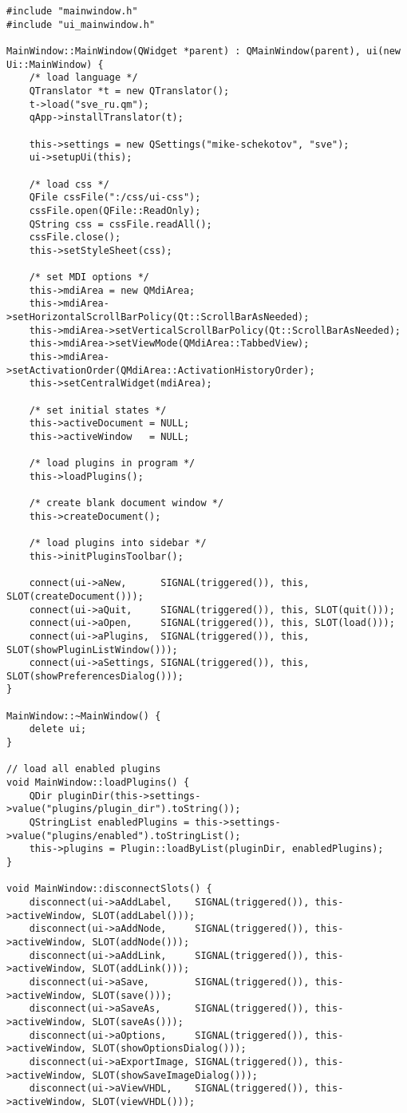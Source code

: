 \begin{lstlisting}
#include "mainwindow.h"
#include "ui_mainwindow.h"

MainWindow::MainWindow(QWidget *parent) : QMainWindow(parent), ui(new Ui::MainWindow) {
    /* load language */
    QTranslator *t = new QTranslator();
    t->load("sve_ru.qm");
    qApp->installTranslator(t);

    this->settings = new QSettings("mike-schekotov", "sve");
    ui->setupUi(this);

    /* load css */
    QFile cssFile(":/css/ui-css");
    cssFile.open(QFile::ReadOnly);
    QString css = cssFile.readAll();
    cssFile.close();
    this->setStyleSheet(css);

    /* set MDI options */
    this->mdiArea = new QMdiArea;
    this->mdiArea->setHorizontalScrollBarPolicy(Qt::ScrollBarAsNeeded);
    this->mdiArea->setVerticalScrollBarPolicy(Qt::ScrollBarAsNeeded);
    this->mdiArea->setViewMode(QMdiArea::TabbedView);
    this->mdiArea->setActivationOrder(QMdiArea::ActivationHistoryOrder);
    this->setCentralWidget(mdiArea);

    /* set initial states */
    this->activeDocument = NULL;
    this->activeWindow   = NULL;

    /* load plugins in program */
    this->loadPlugins();

    /* create blank document window */
    this->createDocument();

    /* load plugins into sidebar */
    this->initPluginsToolbar();

    connect(ui->aNew,      SIGNAL(triggered()), this, SLOT(createDocument()));
    connect(ui->aQuit,     SIGNAL(triggered()), this, SLOT(quit()));
    connect(ui->aOpen,     SIGNAL(triggered()), this, SLOT(load()));
    connect(ui->aPlugins,  SIGNAL(triggered()), this, SLOT(showPluginListWindow()));
    connect(ui->aSettings, SIGNAL(triggered()), this, SLOT(showPreferencesDialog()));
}

MainWindow::~MainWindow() {
    delete ui;
}

// load all enabled plugins
void MainWindow::loadPlugins() {
    QDir pluginDir(this->settings->value("plugins/plugin_dir").toString());
    QStringList enabledPlugins = this->settings->value("plugins/enabled").toStringList();
    this->plugins = Plugin::loadByList(pluginDir, enabledPlugins);
}

void MainWindow::disconnectSlots() {
    disconnect(ui->aAddLabel,    SIGNAL(triggered()), this->activeWindow, SLOT(addLabel()));
    disconnect(ui->aAddNode,     SIGNAL(triggered()), this->activeWindow, SLOT(addNode()));
    disconnect(ui->aAddLink,     SIGNAL(triggered()), this->activeWindow, SLOT(addLink()));
    disconnect(ui->aSave,        SIGNAL(triggered()), this->activeWindow, SLOT(save()));
    disconnect(ui->aSaveAs,      SIGNAL(triggered()), this->activeWindow, SLOT(saveAs()));
    disconnect(ui->aOptions,     SIGNAL(triggered()), this->activeWindow, SLOT(showOptionsDialog()));
    disconnect(ui->aExportImage, SIGNAL(triggered()), this->activeWindow, SLOT(showSaveImageDialog()));
    disconnect(ui->aViewVHDL,    SIGNAL(triggered()), this->activeWindow, SLOT(viewVHDL()));


\end{lstlisting}
